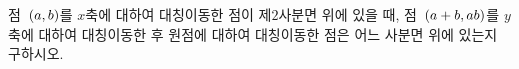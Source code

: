 점~$(a{,}\mkern3mu\mathopen{}b)$를 $x$축에 대하여 대칭이동한 점이 제$2$사분면 위에 있을 때, 점~$(a+b{,}\mkern3mu\mathopen{}ab)$를 $y$축에 대하여 대칭이동한 후 원점에 대하여 대칭이동한 점은 어느 사분면 위에 있는지 구하시오.
